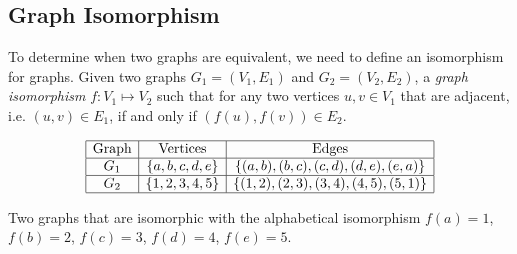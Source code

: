 \subsection{Graph Isomorphism}
To determine when two graphs are equivalent, we need to define an isomorphism for graphs.  Given 
two graphs $G_1 =(V_1,E_1)$ and $G_2 = (V_2,E_2) $, a \textit{graph isomorphism} $f: V_1 \mapsto 
V_2$ 
such that for any two vertices $u,v \in V_1$ that are adjacent, i.e. $(u, v) \in E_1$, if and only 
if $(f(u),f(v)) \in E_2$. 
\begin{table}[!ht]
\begin{center}
$$\begin{array}{|c|c|c|}\hline
\text{Graph}&\text{Vertices}&\text{Edges}\\\hline
G_1&\left\lbrace a,b,c,d,e \right\rbrace & \left\lbrace (a,b),(b,c),(c,d),(d,e),(e,a) \right\rbrace 
\\\hline
G_2&\left\lbrace 1,2,3,4,5 \right\rbrace & \left\lbrace (1,2),(2,3),(3,4),(4,5),(5,1) \right\rbrace 
\\\hline
\end{array} $$
\caption{Two graphs that are isomorphic with the alphabetical isomorphism $f(a)=1$, $f(b)=2$, $f(c) 
= 3$, $f(d)=4$, $f(e)=5$.}
\end{center} 
\label{table:ch1-graph-1}
\end{table}
